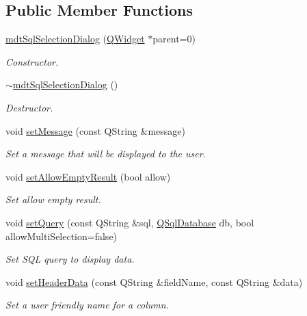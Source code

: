 \subsection*{Public Member Functions}
\begin{DoxyCompactItemize}
\item 
\hyperlink{classmdt_sql_selection_dialog_aaeb4d47e400bff8e58dec9f84f00517c}{mdt\-Sql\-Selection\-Dialog} (\hyperlink{class_q_widget}{Q\-Widget} $\ast$parent=0)
\begin{DoxyCompactList}\small\item\em Constructor. \end{DoxyCompactList}\item 
\hyperlink{classmdt_sql_selection_dialog_a586e3cb812e5e9634f42cb40bfd2d724}{$\sim$mdt\-Sql\-Selection\-Dialog} ()
\begin{DoxyCompactList}\small\item\em Destructor. \end{DoxyCompactList}\item 
void \hyperlink{classmdt_sql_selection_dialog_ab5ea543ebded60b4354c7c0902ca021f}{set\-Message} (const Q\-String \&message)
\begin{DoxyCompactList}\small\item\em Set a message that will be displayed to the user. \end{DoxyCompactList}\item 
void \hyperlink{classmdt_sql_selection_dialog_a5265f64e773a64f34602ddf9b953821b}{set\-Allow\-Empty\-Result} (bool allow)
\begin{DoxyCompactList}\small\item\em Set allow empty result. \end{DoxyCompactList}\item 
void \hyperlink{classmdt_sql_selection_dialog_a7bc61efc9e0e0d141f6109cc86d1634d}{set\-Query} (const Q\-String \&sql, \hyperlink{class_q_sql_database}{Q\-Sql\-Database} db, bool allow\-Multi\-Selection=false)
\begin{DoxyCompactList}\small\item\em Set S\-Q\-L query to display data. \end{DoxyCompactList}\item 
void \hyperlink{classmdt_sql_selection_dialog_afc29f8965c2d6cc103d021ab54298a84}{set\-Header\-Data} (const Q\-String \&field\-Name, const Q\-String \&data)
\begin{DoxyCompactList}\small\item\em Set a user friendly name for a column. \end{DoxyCompactList}\item 

\end{DoxyCompactItemize}
